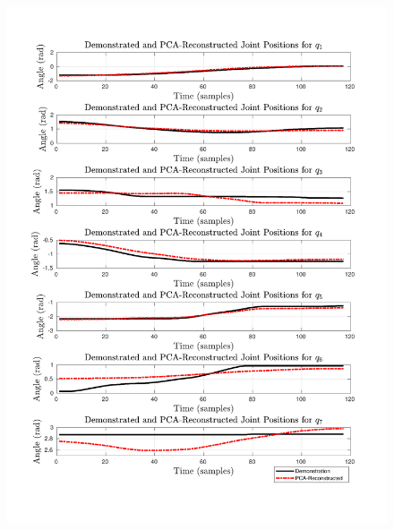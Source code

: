 \documentclass{article}
\begin{document}
\begin{enumerate}
\begin{figure}[!th] 
  \begin{minipage}{0.485\textwidth}
     	\centering 
     	\includegraphics[trim={1.2cm 1.5cm 1.7cm 1.5cm},clip,width=\linewidth]{../../src/JTDS_mat_lib/figures/pca_pos_pour1.pdf}
  \end{minipage}
    \begin{minipage}{0.5\textwidth}
       	\centering 

\end{minipage}
\end{figure}
\end{enumerate}
\end{document}
